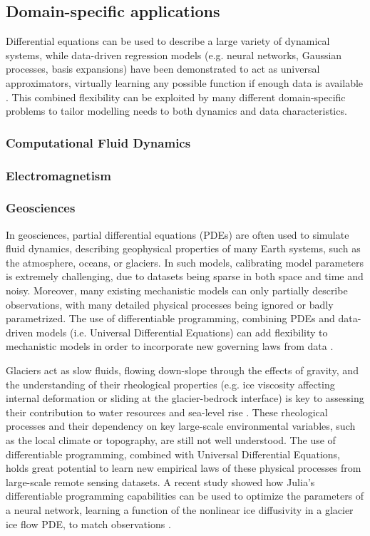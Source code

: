 \subsection{Domain-specific applications}

Differential equations can be used to describe a large variety of dynamical systems, while data-driven regression models (e.g. neural networks, Gaussian processes, basis expansions) have been demonstrated to act as universal approximators, virtually learning any possible function if enough data is available \cite{gorban_1998}. 
This combined flexibility can be exploited by many different domain-specific problems to tailor modelling needs to both dynamics and data characteristics.

\subsubsection{Computational Fluid Dynamics}

\subsubsection{Electromagnetism}

\subsubsection{Geosciences}

In geosciences, partial differential equations (PDEs) are often used to simulate fluid dynamics, describing geophysical properties of many Earth systems, such as the atmosphere, oceans, or glaciers.
In such models, calibrating model parameters is extremely challenging, due to datasets being sparse in both space and time and noisy.
Moreover, many existing mechanistic models can only partially describe observations, with many detailed physical processes being ignored or badly parametrized. 
The use of differentiable programming, combining PDEs and data-driven models (i.e. Universal Differential Equations) can add flexibility to mechanistic models in order to incorporate new governing laws from data \cite{rackauckas2020universal}.


Glaciers act as slow fluids, flowing down-slope through the effects of gravity, and the understanding of their rheological properties (e.g. ice viscosity affecting internal deformation or sliding at the glacier-bedrock interface) is key to assessing their contribution to water resources and sea-level rise \cite{cuffey_physics_2010}. 
These rheological processes and their dependency on key large-scale environmental variables, such as the local climate or topography, are still not well understood.
The use of differentiable programming, combined with Universal Differential Equations, holds great potential to learn new empirical laws of these physical processes from large-scale remote sensing datasets. 
A recent study showed how Julia's differentiable programming capabilities can be used to optimize the parameters of a neural network, learning a function of the nonlinear ice diffusivity in a glacier ice flow PDE, to match observations \cite{bolibar_universal_2023}.


